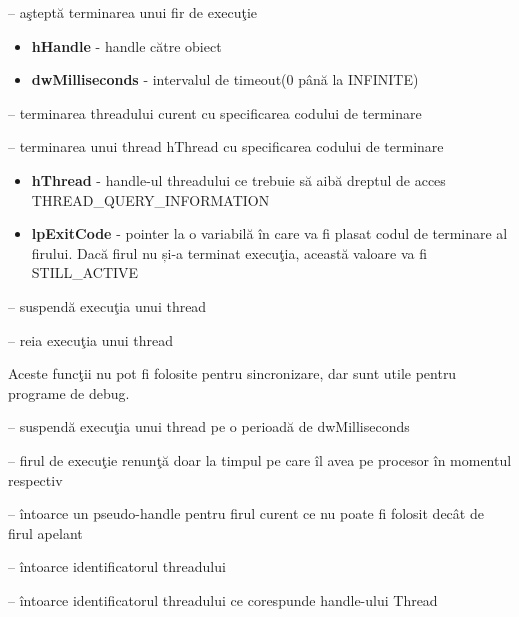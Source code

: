\documentclass{refcard.cs.pub.ro}
\begin{document}
\begin{multicols*}{3}
 -- aşteptă terminarea unui fir de execuţie
\begin{itemize}
  \item \textbf{hHandle} - handle către obiect
  \item \textbf{dwMilliseconds} - intervalul de timeout(0 până la INFINITE)
\end{itemize}

 -- terminarea threadului curent cu specificarea codului de terminare

 -- terminarea unui thread hThread cu specificarea codului de terminare

\begin{itemize}
  \item \textbf{hThread} - handle-ul threadului ce trebuie să aibă dreptul de acces THREAD_QUERY_INFORMATION
  \item \textbf{lpExitCode} - pointer la o variabilă în care va fi plasat codul de terminare al firului. Dacă firul nu
și-a terminat execuţia, această valoare va fi STILL_ACTIVE
\end{itemize}

 -- suspendă execuţia unui thread

 -- reia execuţia unui thread

Aceste funcţii nu pot fi folosite pentru sincronizare, dar sunt utile pentru programe de debug. 

 -- suspendă execuţia unui thread pe o perioadă de dwMilliseconds

 -- firul de execuţie renunţă doar la timpul pe care îl avea pe procesor în momentul
respectiv
\begin{params}
\end{params}

 -- întoarce un pseudo-handle pentru firul curent ce nu poate fi folosit decât de
firul apelant

 -- întoarce identificatorul threadului

 -- întoarce identificatorul threadului ce corespunde handle-ului Thread 


\end{multicols*}
\end{document}
